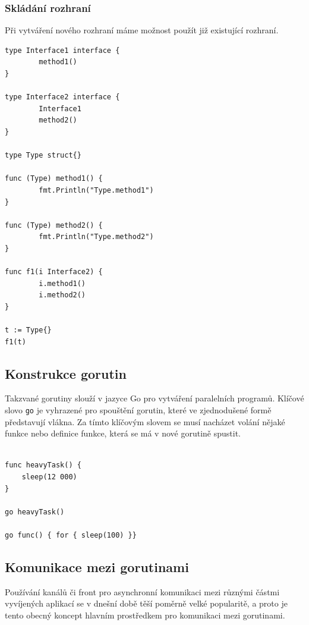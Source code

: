 \documentclass[12pt, a4paper]{article}
\begin{document}
\subsubsection{Skládání rozhraní}
Při vytváření nového rozhraní máme možnost použít již existující rozhraní.

\begin{lstlisting}[caption={Ukázka skládání rozhraní}, captionpos=b]
type Interface1 interface {
        method1()
}
 
type Interface2 interface {
        Interface1
        method2()
}
 
type Type struct{}
 
func (Type) method1() {
        fmt.Println("Type.method1")
}
 
func (Type) method2() {
        fmt.Println("Type.method2")
}
 
func f1(i Interface2) {
        i.method1()
        i.method2()
}

t := Type{}
f1(t)

\end{lstlisting}

\subsection{Konstrukce gorutin}
Takzvané gorutiny slouží v jazyce Go pro vytváření paralelních programů. Klíčové slovo \texttt{go} je vyhrazené pro spouštění gorutin, které ve zjednodušené formě představují vlákna. Za tímto klíčovým slovem se musí nacházet volání nějaké funkce nebo definice funkce, která se má v nové gorutině spustit.

\begin{lstlisting}[caption={Ukázka spouštění gorutin}, captionpos=b]

func heavyTask() {
    sleep(12 000)
}

go heavyTask() 

go func() { for { sleep(100) }}

\end{lstlisting}

\subsection{Komunikace mezi gorutinami}

Používání kanálů či front pro asynchronní komunikaci mezi různými částmi vyvíjených aplikací se v dnešní době těší poměrně velké popularitě, a proto je tento obecný koncept hlavním prostředkem pro komunikaci mezi gorutinami.
\end{document}

